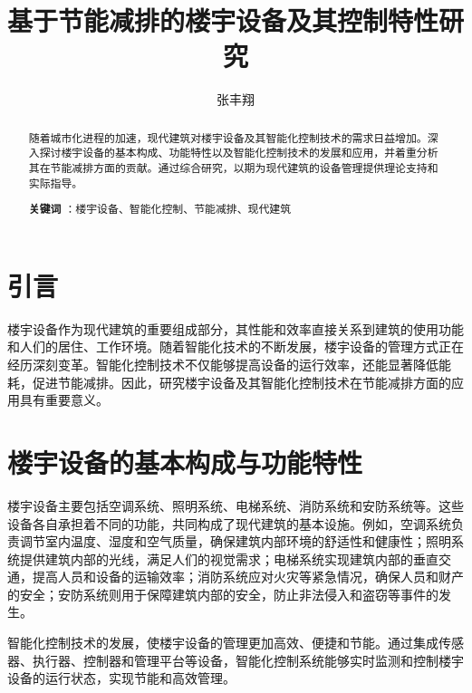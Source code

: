 \documentclass[12pt, a4paper, oneside]{ctexart} %
\title{基于节能减排的楼宇设备及其控制特性研究}             %
\author{张丰翔}             %
\date{}                 %
\begin{document}
\maketitle

\begin{abstract}
随着城市化进程的加速，现代建筑对楼宇设备及其智能化控制技术的需求日益增加。深入探讨楼宇设备的基本构成、功能特性以及智能化控制技术的发展和应用，并着重分析其在节能减排方面的贡献。通过综合研究，以期为现代建筑的设备管理提供理论支持和实际指导。
\par\textbf{关键词} ：楼宇设备、智能化控制、节能减排、现代建筑

\end{abstract}


\newpage

\section{引言}
 楼宇设备作为现代建筑的重要组成部分，其性能和效率直接关系到建筑的使用功能和人们的居住、工作环境。随着智能化技术的不断发展，楼宇设备的管理方式正在经历深刻变革。智能化控制技术不仅能够提高设备的运行效率，还能显著降低能耗，促进节能减排。因此，研究楼宇设备及其智能化控制技术在节能减排方面的应用具有重要意义。
\section{楼宇设备的基本构成与功能特性}
楼宇设备主要包括空调系统、照明系统、电梯系统、消防系统和安防系统等。这些设备各自承担着不同的功能，共同构成了现代建筑的基本设施。例如，空调系统负责调节室内温度、湿度和空气质量，确保建筑内部环境的舒适性和健康性；照明系统提供建筑内部的光线，满足人们的视觉需求；电梯系统实现建筑内部的垂直交通，提高人员和设备的运输效率；消防系统应对火灾等紧急情况，确保人员和财产的安全；安防系统则用于保障建筑内部的安全，防止非法侵入和盗窃等事件的发生。
\par 智能化控制技术的发展，使楼宇设备的管理更加高效、便捷和节能。通过集成传感器、执行器、控制器和管理平台等设备，智能化控制系统能够实时监测和控制楼宇设备的运行状态，实现节能和高效管理。
\end{document}
